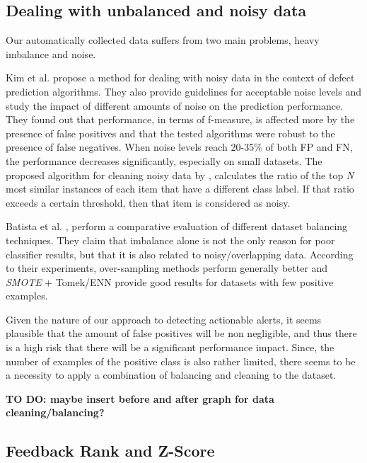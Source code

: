 \documentclass{article}
\begin{document}
\subsection{Dealing with unbalanced and noisy data}

Our automatically collected data suffers from two main problems, heavy imbalance and noise. 

Kim et al. \cite{noise_defect} propose a method for dealing with noisy data in the context of defect prediction algorithms. They also provide guidelines for acceptable noise levels and study the impact of different amounts of noise on the prediction performance.
They found out that performance, in terms of f-measure, is affected more by the presence of false positives and that the tested algorithms were robust to the presence of false negatives. When noise levels reach 20-35\% of both FP and FN, the performance decreases significantly, especially on small datasets.
The proposed algorithm for cleaning noisy data by \cite{noise_defect}, calculates the ratio of the top \textit{N} most similar instances of each item that have a different class label. If that ratio exceeds a certain threshold, then that item is considered as noisy.

Batista et al. \cite{balancing_comparison}, perform a comparative evaluation of different dataset balancing techniques. They claim that imbalance alone is not the only reason for poor classifier results, but that it is also related to noisy/overlapping data. According to their experiments, over-sampling methods perform generally better and \textit{SMOTE} + Tomek/ENN provide good results for datasets with few positive examples.

Given the nature of our approach to detecting actionable alerts, it seems plausible that the amount of false positives will be non negligible, and thus there is a high risk that there will be a significant performance impact. Since, the number of examples of the positive class is also rather limited, there seems to be a necessity to apply a combination of balancing and cleaning to the dataset.

\textbf{TO DO: maybe insert before and after graph for data cleaning/balancing?}

\subsection{Feedback Rank and Z-Score}

\end{document}
